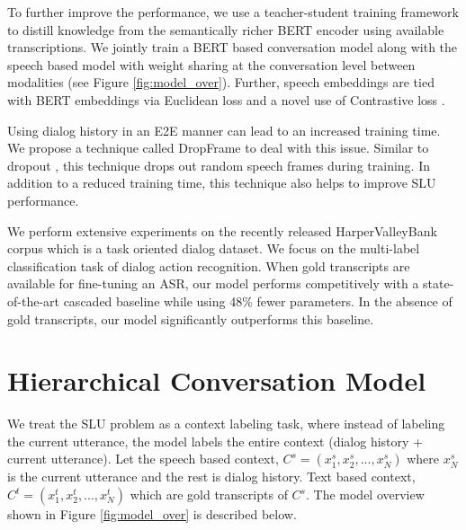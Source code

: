 \documentclass{article}
\begin{document}
To further improve the performance, we use a teacher-student training framework to distill knowledge from the semantically richer BERT encoder using available transcriptions. We jointly train a BERT based conversation model along with the speech based model with weight sharing at the conversation level between modalities (see Figure \ref{fig:model_over}). Further, speech embeddings are tied with BERT embeddings via Euclidean loss \cite{huang2020leveraging} and a novel use of Contrastive loss \cite{zhang2021cross}.


Using dialog history in an E2E manner can lead to an increased training time. We propose a technique called DropFrame to deal with this issue.
Similar to dropout \cite{srivastava2013improving}, this technique drops out random speech frames during training. In addition to a reduced training time, this technique also helps to improve SLU performance.

We perform extensive experiments on the recently released HarperValleyBank corpus \cite{wu2020harpervalleybank} which is a task oriented dialog dataset. We focus on the multi-label classification task of dialog action recognition. When gold transcripts are available for fine-tuning an ASR, our model performs competitively with a state-of-the-art cascaded baseline while using 48\% fewer parameters. In the absence of gold transcripts, our model significantly outperforms this baseline.

\section{Hierarchical Conversation Model}
\label{sec:conv_model}
We treat the SLU problem as a context labeling task, where instead of labeling the current utterance, the model labels the entire context (dialog history + current utterance). Let the speech based context, $C^s = (x_1^s, x_2^s, ..., x_N^s)$ where $x_N^s$ is the current utterance and the rest is dialog history. Text based context, $C^t = (x_1^t, x_2^t, ..., x_N^t)$ which are gold transcripts of $C^s$. The model overview shown in Figure \ref{fig:model_over} is described below. \\
\end{document}
